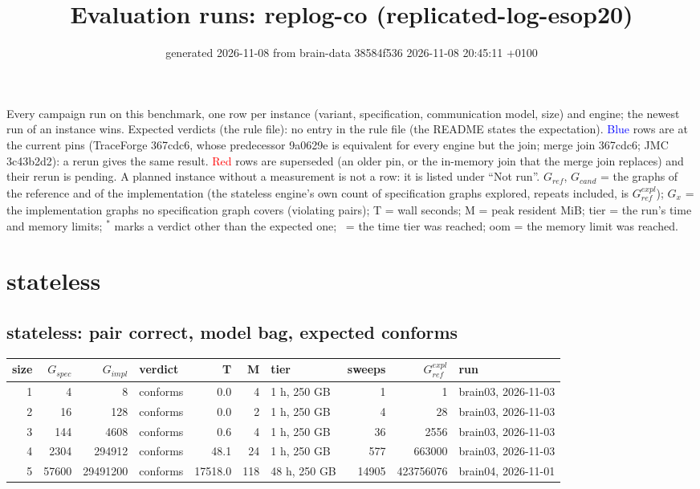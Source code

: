 \documentclass[10pt]{article}
\title{Evaluation runs: \textsf{replog-co} (replicated-log-esop20)}
\author{}
\date{generated 2026-11-08 from brain-data 38584f536 2026-11-08 20:45:11 +0100}
\begin{document}
\maketitle\small
\noindent Every campaign run on this benchmark, one row per instance (variant, specification, communication model, size) and engine; the newest run of an instance wins. Expected verdicts (the rule file): no entry in the rule file (the README states the expectation). \textcolor{blue}{Blue} rows are at the current pins (TraceForge 367cdc6, whose predecessor 9a0629e is equivalent for every engine but the join; merge join 367cdc6; JMC 3c43b2d2): a rerun gives the same result. \textcolor{red}{Red} rows are superseded (an older pin, or the in-memory join that the merge join replaces) and their rerun is pending. A planned instance without a measurement is not a row: it is listed under ``Not run''. $G_{\mathit{ref}}$, $G_{\mathit{cand}}$ = the graphs of the reference and of the implementation (the stateless engine's own count of specification graphs explored, repeats included, is $G_{\mathit{ref}}^{\mathit{expl}}$); $G_x$ = the implementation graphs no specification graph covers (violating pairs); T = wall seconds; M = peak resident MiB; tier = the run's time and memory limits; $^{\ast}$ marks a verdict other than the expected one; \faClock\ = the time tier was reached; oom = the memory limit was reached.

\section*{stateless}
\subsection*{stateless: pair \textsf{correct}, model bag, expected conforms}
\begin{longtable}{@{}rrrlrrlrrl@{}}
\toprule
size & $G_{\mathit{spec}}$ & $G_{\mathit{impl}}$ & verdict & T & M & tier & sweeps & $G_{\mathit{ref}}^{\mathit{expl}}$ & run \\
\midrule
\endhead
\color{blue} 1 & 4 & 8 & conforms & 0.0 & 4 & 1 h, 250 GB & 1 & 1 & brain03, 2026-11-03 \\
\color{blue} 2 & 16 & 128 & conforms & 0.0 & 2 & 1 h, 250 GB & 4 & 28 & brain03, 2026-11-03 \\
\color{blue} 3 & 144 & 4608 & conforms & 0.6 & 4 & 1 h, 250 GB & 36 & 2556 & brain03, 2026-11-03 \\
\color{blue} 4 & 2304 & 294912 & conforms & 48.1 & 24 & 1 h, 250 GB & 577 & 663000 & brain03, 2026-11-03 \\
\color{blue} 5 & 57600 & 29491200 & conforms & 17518.0 & 118 & 48 h, 250 GB & 14905 & 423756076 & brain04, 2026-11-01 \\
\bottomrule
\end{longtable}
\end{document}
